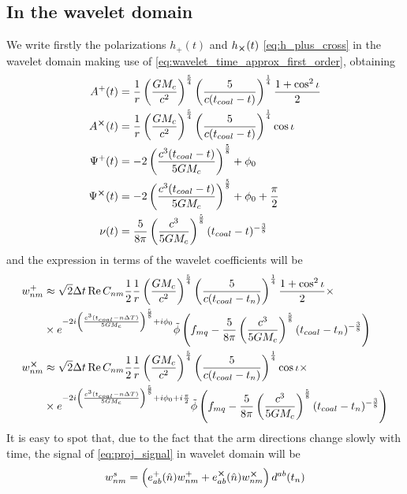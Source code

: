 \documentclass{article}
\begin{document}
\subsection{In the wavelet domain}
We write firstly the polarizations $h_+(t)$ and $h_{\cross}(t)$ \eqref{eq:h_plus_cross} in the wavelet domain making use of \eqref{eq:wavelet_time_approx_first_order}, obtaining
%
\begin{align}
A^+(t)&=\frac{1}{r}\left(\frac{GM_c}{c^2}\right)^{\frac{5}{4}}\left(\frac{5}{c(t_{coal}-t)}\right)^{\frac{1}{4}}\frac{1+\cos^2\iota}{2}\nonumber\\
A^{\cross}(t)&=\frac{1}{r}\left(\frac{GM_c}{c^2}\right)^{\frac{5}{4}}\left(\frac{5}{c(t_{coal}-t)}\right)^{\frac{1}{4}}\cos\iota\nonumber\\
\Psi^+(t)&=-2\left(\frac{c^3 (t_{coal}-t)}{5GM_c}\right)^{\frac 5 8}+\phi_0\nonumber\\
\Psi^{\cross}(t)&=-2\left(\frac{c^3 (t_{coal}-t)}{5GM_c}\right)^{\frac 5 8}+\phi_0+\frac{\pi}{2}\nonumber\\
\nu(t)&=\frac{5}{8\pi}\left(\frac{c^3}{5GM_c}\right)^{\frac 5 8}(t_{coal}-t)^{-\frac 3 8}
\end{align}
%
and the expression in terms of the wavelet coefficients will be
%
\begin{align}
\label{eq:wavelet_chirp}
w_{n m}^{+} &\approx \sqrt{2} \Delta t \Re C_{n m} \frac{1}{2} \frac{1}{r}\left(\frac{GM_c}{c^2}\right)^{\frac{5}{4}}\left(\frac{5}{c(t_{coal}-t_n)}\right)^{\frac{1}{4}}\frac{1+\cos^2\iota}{2}  \times\nonumber\\
&\times e^{-2i\left(\frac{c^3 (t_{coal}-n\Delta T)}{5GM_c}\right)^{\frac 5 8}+i\phi_0}\tilde{\phi}\left( f_{mq} -\frac{5}{8\pi}\left(\frac{c^3}{5GM_c}\right)^{\frac 5 8}(t_{coal}-t_n)^{-\frac 3 8} \right)\nonumber\\
w_{n m}^{\cross} &\approx \sqrt{2} \Delta t \Re C_{n m} \frac{1}{2} \frac{1}{r}\left(\frac{GM_c}{c^2}\right)^{\frac{5}{4}}\left(\frac{5}{c(t_{coal}-t_n)}\right)^{\frac{1}{4}}\cos\iota  \times\nonumber\\
&\times e^{-2i\left(\frac{c^3 (t_{coal}-n\Delta T)}{5GM_c}\right)^{\frac 5 8}+i\phi_0+i\frac{\pi}{2}}\tilde{\phi}\left( f_{mq} -\frac{5}{8\pi}\left(\frac{c^3}{5GM_c}\right)^{\frac 5 8}(t_{coal}-t_n)^{-\frac 3 8} \right)
\end{align}
%
It is easy to spot that, due to the fact that the arm directions change slowly with time, the signal of \eqref{eq:proj_signal} in wavelet domain will be
%
\begin{align}
w_{nm}^s=\left(e^+_{ab}(\hat n)w_{nm}^+ + e^{\cross}_{ab}(\hat n)w_{nm}^{\cross}\right)d^{ab}(t_n)
\end{align}




%
\end{document}
